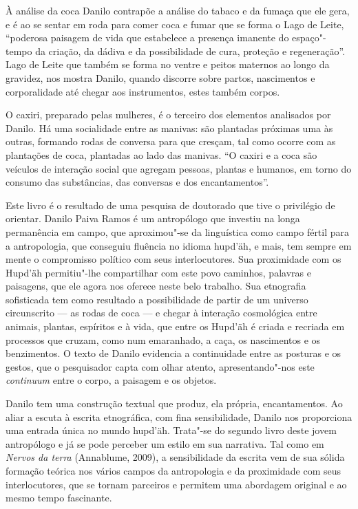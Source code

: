 À análise da coca Danilo contrapõe a análise do tabaco e da fumaça que
ele gera, e é ao se sentar em roda para comer coca e fumar que se forma
o Lago de Leite, ``poderosa paisagem de vida que estabelece a presença
imanente do espaço"-tempo da criação, da dádiva e da possibilidade de
cura, proteção e regeneração''. Lago de Leite que também se forma no
ventre e peitos maternos ao longo da gravidez, nos mostra Danilo, quando
discorre sobre partos, nascimentos e corporalidade até chegar aos
instrumentos, estes também corpos.

O caxiri, preparado pelas mulheres, é o terceiro dos elementos
analisados por Danilo. Há uma socialidade entre as manivas: são
plantadas próximas uma às outras, formando rodas de conversa para que
cresçam, tal como ocorre com as plantações de coca, plantadas ao lado
das manivas. ``O caxiri e a coca são veículos de interação social que
agregam pessoas, plantas e humanos, em torno do consumo das substâncias,
das conversas e dos encantamentos''.

Este livro é o resultado de uma pesquisa de doutorado que tive o
privilégio de orientar. Danilo Paiva Ramos é um antropólogo que investiu
na longa permanência em campo, que aproximou"-se da linguística como
campo fértil para a antropologia, que conseguiu fluência no idioma
hupd'äh, e mais, tem sempre em mente o compromisso político com seus
interlocutores. Sua proximidade com os Hupd'äh permitiu"-lhe compartilhar
com este povo caminhos, palavras e paisagens, que ele agora nos oferece
neste belo trabalho. Sua etnografia sofisticada tem como resultado a
possibilidade de partir de um universo circunscrito --- as rodas de coca
--- e chegar à interação cosmológica entre animais, plantas, espíritos e
à vida, que entre os Hupd'äh é criada e recriada em processos que
cruzam, como num emaranhado, a caça, os nascimentos e os benzimentos. O
texto de Danilo evidencia a continuidade entre as posturas e os gestos,
que o pesquisador capta com olhar atento, apresentando"-nos este
\textit{continuum} entre o corpo, a paisagem e os objetos.

Danilo tem uma construção textual que produz, ela própria,
encantamentos. Ao aliar a escuta à escrita etnográfica, com fina
sensibilidade, Danilo nos proporciona uma entrada única no mundo
hupd'äh. Trata"-se do segundo livro deste jovem antropólogo e já se pode
perceber um estilo em sua narrativa. Tal como em \textit{Nervos da terra}
(Annablume, 2009), a sensibilidade da escrita vem de sua sólida formação
teórica nos vários campos da antropologia e da proximidade com seus
interlocutores, que se tornam parceiros e permitem uma abordagem
original e ao mesmo tempo fascinante.